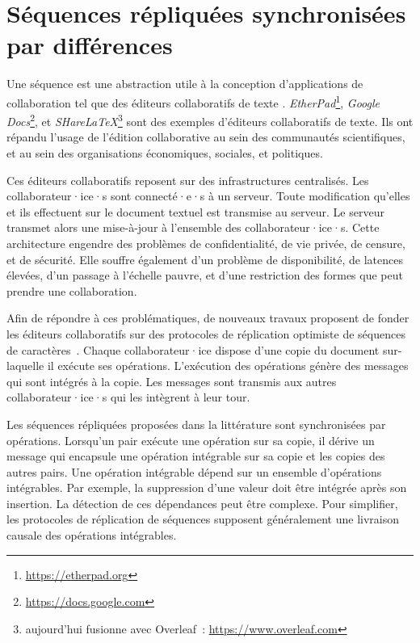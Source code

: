 
\chapter{Séquences répliquées synchronisées par différences}
\label{ch:dotted-logootsplit}

\minitoc
\bigskip

Une séquence est une abstraction utile à la conception d'applications de collaboration tel que des éditeurs collaboratifs de texte \autocite{2017_nicolas-mute-demo,nedelec2016_crate}.
\emph{EtherPad}\footnote{\url{https://etherpad.org}}, \emph{Google Docs}\footnote{\url{https://docs.google.com}}, et \emph{SHareLaTeX}\footnote{aujourd'hui fusionne avec Overleaf~: \url{https://www.overleaf.com}} sont des exemples d'éditeurs collaboratifs de texte.
Ils ont répandu l'usage de l'édition collaborative au sein des communautés scientifiques, et au sein des organisations économiques, sociales, et politiques.

Ces éditeurs collaboratifs reposent sur des infrastructures centralisés.
Les collaborateur·ice·s sont connecté·e·s à un serveur.
Toute modification qu'elles et ils effectuent sur le document textuel est transmise au serveur.
Le serveur transmet alors une mise-à-jour à l'ensemble des collaborateur·ice·s.
Cette architecture engendre des problèmes de confidentialité, de vie privée, de censure, et de sécurité.
Elle souffre également d'un problème de disponibilité, de latences élevées, d'un passage à l'échelle pauvre,
et d'une restriction des formes que peut prendre une collaboration.

Afin de répondre à ces problématiques, de nouveaux travaux proposent de fonder les éditeurs collaboratifs sur des protocoles de réplication optimiste de séquences de caractères~\autocite{oster_2006_woot,weiss_2009_logoot,preguica_2009_treedoc,roh_2011_rga}.
Chaque collaborateur·ice dispose d'une copie du document sur-laquelle il exécute ses opérations.
L'exécution des opérations génère des messages qui sont intégrés à la copie.
Les messages sont transmis aux autres collaborateur·ice·s qui les intègrent à leur tour.

Les séquences répliquées proposées dans la littérature sont synchronisées par opérations.
Lorsqu'un pair exécute une opération sur sa copie, il dérive un message qui encapsule une opération intégrable sur sa copie et les copies des autres pairs.
Une opération intégrable dépend sur un ensemble d'opérations intégrables.
Par exemple, la suppression d'une valeur doit être intégrée après son insertion.
La détection de ces dépendances peut être complexe.
Pour simplifier, les protocoles de réplication de séquences supposent généralement une livraison causale des opérations intégrables.

